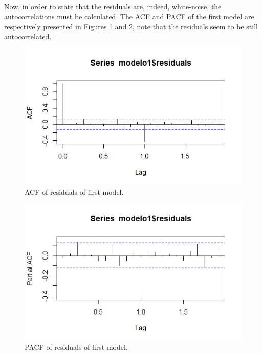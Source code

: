 \documentclass[fleqn]{article}
\begin{document}
\begin{enumerate}
\begin{itemize}
        Now, in order to state that the residuals are, indeed, white-noise, the autocorrelations must be calculated. The ACF and PACF of the first model are respectively presented in Figures \ref{fig:ACFmod1res} and \ref{fig:PACFmod1res}, note that the residuals seem to be still autocorrelated.
        \begin{figure}[H]
        \centering
        \includegraphics[width=0.75\linewidth]{figs/ACFmod1res.png}
        \caption{ACF of residuals of first model.}
        \label{fig:ACFmod1res}
        \end{figure}
        \begin{figure}[H]
        \centering
        \includegraphics[width=0.75\linewidth]{figs/PACFmod1res.png}
        \caption{PACF of residuals of first model.}
        \label{fig:PACFmod1res}
        \end{figure}
        

\end{itemize}
\end{enumerate}
\end{document}
